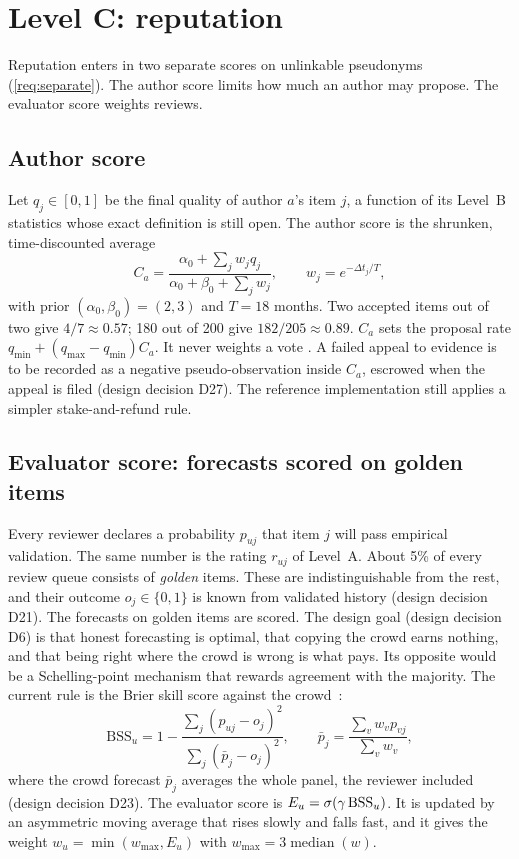 \section{Level C: reputation}\label{sec:levelc}

Reputation enters in two separate scores on unlinkable pseudonyms (\cref{req:separate}). The
author score limits how much an author may propose. The evaluator score weights reviews.

\subsection{Author score}

Let $q_j\in[0,1]$ be the final quality of author $a$'s item $j$, a function of its Level~B
statistics whose exact definition is still open. The author score is the shrunken, time-discounted
average
\begin{equation}\label{eq:author}
  C_a=\frac{\alpha_0+\sum_j w_jq_j}{\alpha_0+\beta_0+\sum_j w_j},\qquad w_j=e^{-\Delta t_j/T},
\end{equation}
with prior $(\alpha_0,\beta_0)=(2,3)$ and $T=18$ months. Two accepted items out of two give
$4/7\approx0.57$; 180 out of 200 give $182/205\approx0.89$. $C_a$ sets the proposal rate
$q_{\min}+(q_{\max}-q_{\min})C_a$. It never weights a vote \designchoice. A failed appeal to
evidence is to be recorded as a negative pseudo-observation inside $C_a$, escrowed when the appeal
is filed (design decision D27). The reference implementation still applies a simpler
stake-and-refund rule.

\subsection{Evaluator score: forecasts scored on golden items}

Every reviewer declares a probability $p_{uj}$ that item $j$ will pass empirical validation. The
same number is the rating $r_{uj}$ of Level~A. About 5\% of every review queue consists of
\emph{golden} items. These are indistinguishable from the rest, and their outcome
$o_j\in\{0,1\}$ is known from validated history (design decision D21). The forecasts on golden
items are scored. The design goal (design decision D6) is that honest forecasting is optimal, that
copying the crowd earns nothing, and that being right where the crowd is wrong is what pays. Its
opposite would be a Schelling-point mechanism that rewards agreement with the majority. The
current rule is the Brier skill score against the crowd~\cite{brier1950,murphy1988skill}:
\begin{equation}\label{eq:bss}
  \mathrm{BSS}_u=1-\frac{\sum_j(p_{uj}-o_j)^2}{\sum_j(\bar p_j-o_j)^2},\qquad
  \bar p_j=\frac{\sum_v w_vp_{vj}}{\sum_v w_v},
\end{equation}
where the crowd forecast $\bar p_j$ averages the whole panel, the reviewer included (design
decision D23). The evaluator score is $E_u=\sigma(\gamma\,\mathrm{BSS}_u)$. It is updated by an
asymmetric moving average that rises slowly and falls fast, and it gives the weight
$w_u=\min(w_{\max},E_u)$ with $w_{\max}=3\operatorname{median}(w)$.

